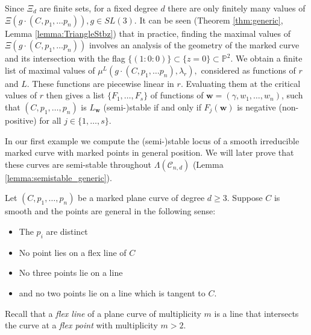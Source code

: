 \documentclass{amsart}
\newcommand{\Pj}{\mathbb{P}}
\newcommand{\mc}{\mathcal}
\numberwithin{equation}{section}
\theoremstyle{definition}
\begin{document}
  Since $\Xi_d$ are finite sets, for a fixed degree $d$ there are only finitely many values of $\Xi(g \cdot (C, p_1, \dots p_n)), g \in SL(3).$ It can be seen (Theorem \ref{thm:generic}, Lemma \ref{lemma:TriangleStbz}) that in practice, finding the maximal values of $\Xi(g \cdot (C, p_1, \dots p_n))$ involves an analysis of the geometry of the marked curve and its intersection with the flag $\{(1:0:0)\} \subset \{z=0\} \subset \Pj^2$. We obtain a finite list of maximal values of  $\mu^L(g \cdot (C, p_1, \dots p_n), \lambda_r),$ considered as functions of $r$ and $L$. These functions are piecewise linear in $r$. Evaluating them at the critical values of $r$ then gives a list $\{F_1, \dots , F_s\}$ of functions of $\mathbf{w} = (\gamma, w_1, \dots , w_n)$, such that $(C, p_1, \dots, p_n)$ is $L_{\mathbf{w}}$ (semi-)stable if and only if $F_j(\mathbf{w})$ is negative (non-positive) for all $j \in \{1, \dots ,s\}$.

In our first example we compute the (semi-)stable locus of a smooth irreducible marked curve with marked points in general position. We will later prove that these curves are semi-stable throughout $\Lambda(\mc{C}_{n,d})$ (Lemma \ref{lemma:semistable_generic}).  



Let $(C, p_1 , \dots , p_n)$ be a marked plane curve of degree $d \geq 3$. Suppose $C$ is smooth and the points are general in the following sense:
    \begin{itemize}
        
    \item The $p_i$ are distinct 
    \item No point lies on a flex line of $C$
    \item No three points lie on a line
    \item and no two points lie on a line which is tangent to $C$.
    \end{itemize} 

    Recall that a \textit{flex line} of a plane curve of multiplicity $m$ is a line that intersects the curve at a \textit{flex point} with multiplicity $m>2$.
\end{document}
